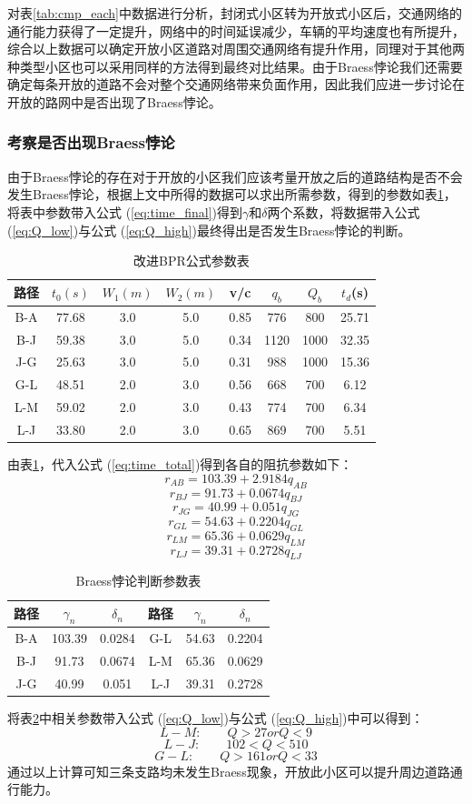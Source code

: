 \documentclass[fontset=windows,a4paper,12pt]{ctexart}
\renewcommand{\eqref}[1]{公式 (\ref{#1})}
\begin{document}
		对表\ref{tab:cmp_each}中数据进行分析，封闭式小区转为开放式小区后，交通网络的通行能力获得了一定提升，网络中的时间延误减少，车辆的平均速度也有所提升，综合以上数据可以确定开放小区道路对周围交通网络有提升作用，同理对于其他两种类型小区也可以采用同样的方法得到最终对比结果。由于Braess悖论我们还需要确定每条开放的道路不会对整个交通网络带来负面作用，因此我们应进一步讨论在开放的路网中是否出现了Braess悖论。	
		\subsubsection{考察是否出现Braess悖论}
			由于Braess悖论的存在对于开放的小区我们应该考量开放之后的道路结构是否不会发生Braess悖论，根据上文中所得的数据可以求出所需参数，得到的参数如表\ref{tab:braess_args}，将表中参数带入\eqref{eq:time_final}得到$\gamma$和$\delta$两个系数，将数据带入\eqref{eq:Q_low}与\eqref{eq:Q_high}最终得出是否发生Braess悖论的判断。
			\begin{table}[!htbp]
				\centering
				\caption{改进BPR公式参数表}
				\label{tab:braess_args}
				\begin{tabular}{c|ccccccc}
					\toprule[1pt] 
					路径&	$t_0(s)$&	$W_1(m)$&	$W_2(m)$&	v/c&	$q_b$& $Q_b$&	$t_d$(s)\\
					\hline
					B-A& 77.68& 3.0& 5.0& 0.85& 776&800&25.71\\
					B-J& 59.38& 3.0& 5.0& 0.34& 1120&1000&32.35\\
					J-G& 25.63&	3.0& 5.0& 0.31& 988& 1000&15.36\\
					G-L& 48.51& 2.0& 3.0& 0.56& 668& 700&6.12\\
					L-M& 59.02& 2.0& 3.0& 0.43& 774& 700&6.34\\
					L-J& 33.80& 2.0& 3.0& 0.65& 869& 700&5.51\\
					\bottomrule[1pt]
				\end{tabular} 
			\end{table}
			由表\ref{tab:braess_args}，代入\eqref{eq:time_total}得到各自的阻抗参数如下：
			$$r_{AB}=103.39+2.9184q_{AB}$$
			$$r_{BJ}=91.73+0.0674q_{BJ}$$
			$$r_{JG}=40.99+0.051q_{JG}$$
			$$r_{GL}=54.63+0.2204q_{GL}$$
			$$r_{LM}=65.36+0.0629q_{LM}$$
			$$r_{LJ}=39.31+0.2728q_{LJ}$$
			\begin{table}[!htbp]
				\centering
				\caption{Braess悖论判断参数表}
				\label{tab:braess_judge}
				\begin{tabular}{c|cc|c|cc}
					\toprule[1pt] 
					路径&	$\gamma_n$&	$\delta_n$&	路径&	$\gamma_n$&	$\delta_n$\\
					\hline
					B-A& 103.39& 0.0284& G-L& 54.63& 0.2204\\
					B-J& 91.73& 0.0674& L-M& 65.36& 0.0629\\
					J-G& 40.99&	0.051& L-J& 39.31& 0.2728\\
					\bottomrule[1pt]
				\end{tabular} 
			\end{table}
			将表\ref{tab:braess_judge}中相关参数带入\eqref{eq:Q_low}与\eqref{eq:Q_high}中可以得到：
			$$L-M:\qquad Q>27 or Q<9 $$
			$$L-J:\qquad 102<Q<510 $$
			$$G-L:\qquad Q>161 or Q<33 $$
			通过以上计算可知三条支路均未发生Braess现象，开放此小区可以提升周边道路通行能力。
			
\end{document}
